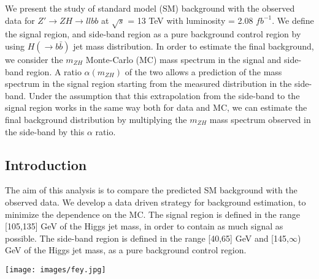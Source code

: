 \documentclass[a0,portrait]{a0poster}
\begin{document}
\begin{center}
\begin{multicols}{1}
\begin{textbox0}
      We present the study of standard model (SM) background with the observed data for $Z' \rightarrow ZH \rightarrow llbb$ at $\sqrt{s}$ = 13 TeV with luminosity = 2.08 $fb^{-1}$. We define the signal region, and side-band region as a pure background control region by using $H (\rightarrow b\bar{b})$ jet mass distribution. In order to estimate the final background, we consider the $m_{ZH}$ Monte-Carlo (MC) mass spectrum in the signal and side-band region. A ratio $\alpha (m_{ZH})$ of the two allows a prediction of the mass spectrum in the signal region starting from the measured distribution in the side-band. Under the assumption that this extrapolation from the side-band to the signal region works in the same way both for data and MC, we can estimate the final background distribution by multiplying the $m_{ZH}$ mass spectrum observed in the side-band by this $\alpha$ ratio.

    \end{textbox0}

  \end{multicols}
  
  \vspace{-1.25em}

  \begin{multicols}{3}
    
    \begin{textbox}
      \section*{\color{FireBrick} Introduction}

      The aim of this analysis is to compare the predicted SM background with the observed data. We develop a data driven strategy for background estimation, to minimize the dependence on the MC. The signal region is defined in the range [105,135] GeV of the Higgs jet mass, in order to contain as much signal as possible. The side-band region is defined in the range [40,65] GeV and [145,$\infty$) GeV of the Higgs jet mass, as a pure background control region.
        \vspace{0.85em}
        \begin{center}
          \texttt{[image: images/fey.jpg]}
          \label{fig:feyman}
        \end{center}
    \end{textbox}


\end{multicols}
\end{center}
\end{document}
